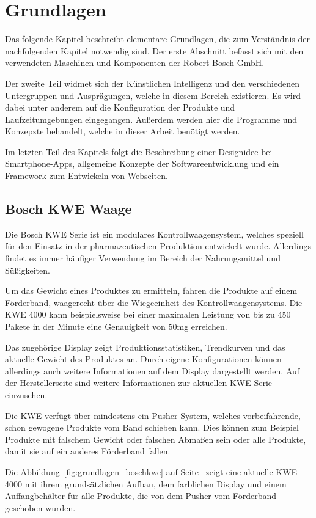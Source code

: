 \chapter{Grundlagen}
\label{ch:grundlagen}
Das folgende Kapitel beschreibt elementare Grundlagen, die zum Verständnis der nachfolgenden Kapitel notwendig sind. Der
erste Abschnitt befasst sich mit den verwendeten Maschinen und Komponenten der Robert Bosch GmbH.

Der zweite Teil widmet sich der Künstlichen Intelligenz und den verschiedenen Untergruppen und Ausprägungen, welche in
diesem Bereich existieren. Es wird dabei unter anderem auf die Konfiguration der Produkte und Laufzeitumgebungen
eingegangen. Außerdem werden hier die Programme und Konzepzte behandelt, welche in dieser Arbeit benötigt werden.

Im letzten Teil des Kapitels folgt die Beschreibung einer Designidee bei Smartphone-Apps, allgemeine Konzepte der
Softwareentwicklung und ein Framework zum Entwickeln von Webseiten.

\section{Bosch KWE Waage}
Die Bosch KWE Serie ist ein modulares Kontrollwaagensystem, welches speziell für den Einsatz in der pharmazeutischen
Produktion entwickelt wurde. Allerdings findet es immer häufiger Verwendung im Bereich der Nahrungsmittel und
Süßigkeiten.

Um das Gewicht eines Produktes zu ermitteln, fahren die Produkte auf einem Förderband, waagerecht über die Wiegeeinheit
des Kontrollwaagensystems. Die KWE 4000 kann beispielsweise bei einer maximalen Leistung von bis zu 450 Pakete in der
Minute eine Genauigkeit von 50mg erreichen.

Das zugehörige Display zeigt Produktionsstatistiken, Trendkurven und das aktuelle Gewicht des Produktes an. Durch eigene
Konfigurationen können allerdings auch weitere Informationen auf dem Display dargestellt werden. Auf der
Herstellerseite\cite{online_grundlagen_boschkwe} sind weitere Informationen zur aktuellen KWE-Serie einzusehen.

Die KWE verfügt über mindestens ein Pusher-System, welches vorbeifahrende, schon gewogene Produkte vom Band schieben
kann. Dies können zum Beispiel Produkte mit falschem Gewicht oder falschen Abmaßen sein oder alle Produkte, damit sie
auf ein anderes Förderband fallen.

Die Abbildung~\ref{fig:grundlagen_boschkwe} auf Seite~\pageref{fig:grundlagen_boschkwe} zeigt eine aktuelle KWE 4000 mit
ihrem grundsätzlichen Aufbau, dem farblichen Display und einem Auffangbehälter für alle Produkte, die von dem Pusher vom
Förderband geschoben wurden.

